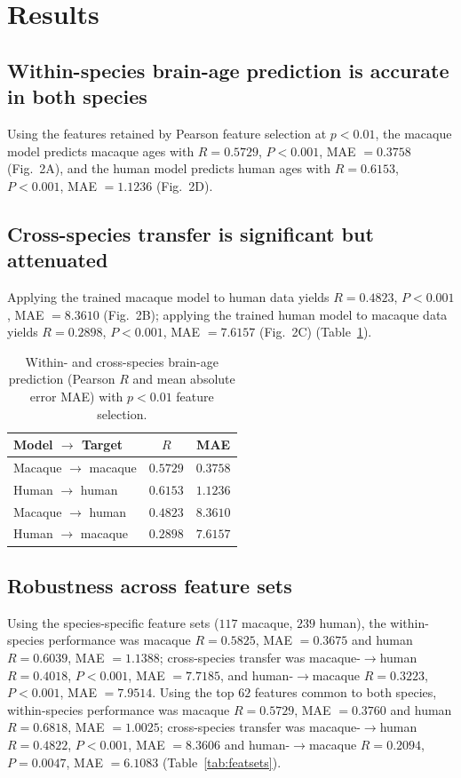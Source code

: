 \documentclass[11pt]{article}
\begin{document}
\section{Results}

\subsection{Within-species brain-age prediction is accurate in both species}
Using the features retained by Pearson feature selection at $p < 0.01$, the macaque model predicts macaque ages with $R = 0.5729$, $P < 0.001$, MAE $= 0.3758$ (Fig.~2A), and the human model predicts human ages with $R = 0.6153$, $P < 0.001$, MAE $= 1.1236$ (Fig.~2D).

\subsection{Cross-species transfer is significant but attenuated}
Applying the trained macaque model to human data yields $R = 0.4823$, $P < 0.001$, MAE $= 8.3610$ (Fig.~2B); applying the trained human model to macaque data yields $R = 0.2898$, $P < 0.001$, MAE $= 7.6157$ (Fig.~2C) (Table~\ref{tab:cross}).

\begin{table}[h]
\centering
\caption{Within- and cross-species brain-age prediction (Pearson $R$ and mean absolute error MAE) with $p < 0.01$ feature selection.}
\label{tab:cross}
\begin{tabular}{lcc}
\toprule
Model $\to$ Target & $R$ & MAE \\
\midrule
Macaque $\to$ macaque & $0.5729$ & $0.3758$ \\
Human $\to$ human & $0.6153$ & $1.1236$ \\
Macaque $\to$ human & $0.4823$ & $8.3610$ \\
Human $\to$ macaque & $0.2898$ & $7.6157$ \\
\bottomrule
\end{tabular}
\end{table}

\subsection{Robustness across feature sets}
Using the species-specific feature sets ($117$ macaque, $239$ human), the within-species performance was macaque $R = 0.5825$, MAE $= 0.3675$ and human $R = 0.6039$, MAE $= 1.1388$; cross-species transfer was macaque-$\to$human $R = 0.4018$, $P < 0.001$, MAE $= 7.7185$, and human-$\to$macaque $R = 0.3223$, $P < 0.001$, MAE $= 7.9514$. Using the top $62$ features common to both species, within-species performance was macaque $R = 0.5729$, MAE $= 0.3760$ and human $R = 0.6818$, MAE $= 1.0025$; cross-species transfer was macaque-$\to$human $R = 0.4822$, $P < 0.001$, MAE $= 8.3606$ and human-$\to$macaque $R = 0.2094$, $P = 0.0047$, MAE $= 6.1083$ (Table~\ref{tab:featsets}).
\end{document}

